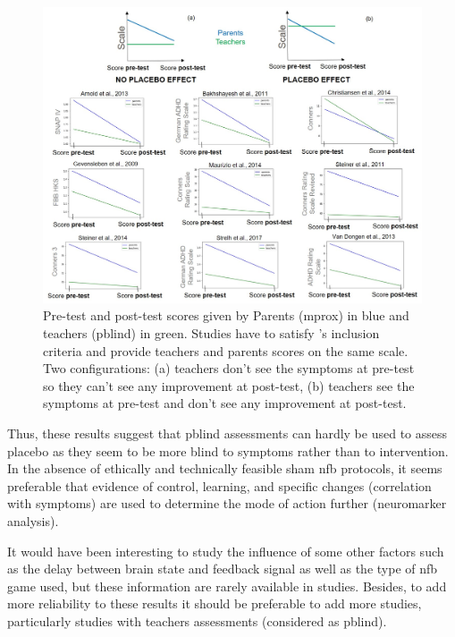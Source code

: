 \begin{figure}[h!]
  \centering
  \includegraphics[width=1.0\linewidth]{figures/discussion_on_placebo_effect_colors_2-columns_fitting_image}
  \caption{Pre-test and post-test scores given by Parents (\gls{mprox}) in blue and teachers (\gls{pblind}) in green. Studies have to satisfy
	\citeauthor{Cortese2016}'s inclusion criteria and provide teachers and parents scores on the same scale. Two configurations: (a) teachers don’t see the symptoms at 
	pre-test so they can’t see any improvement at post-test, (b) teachers see the symptoms at pre-test and don’t see any improvement at post-test.}
  \label{Figure:discussion_on_placebo_effect_colors_2-columns_fitting_image}
\end{figure} 

Thus, these results suggest that \gls{pblind} assessments can hardly be used to assess placebo as they seem to be more blind
to symptoms rather than to intervention. In the absence of ethically and technically feasible sham \gls{nfb} protocols, it seems preferable 
that evidence of control, learning, and specific changes (correlation with symptoms) are used to determine the mode of action further 
(neuromarker analysis).      

It would have been interesting to study the influence of some other factors such as the delay between brain state and feedback 
signal as well as the type of \gls{nfb} game used, but these information are rarely available in studies. Besides, 
to add more reliability to these results it should be preferable to add more studies, 
particularly studies with teachers assessments (considered as \gls{pblind}). 

